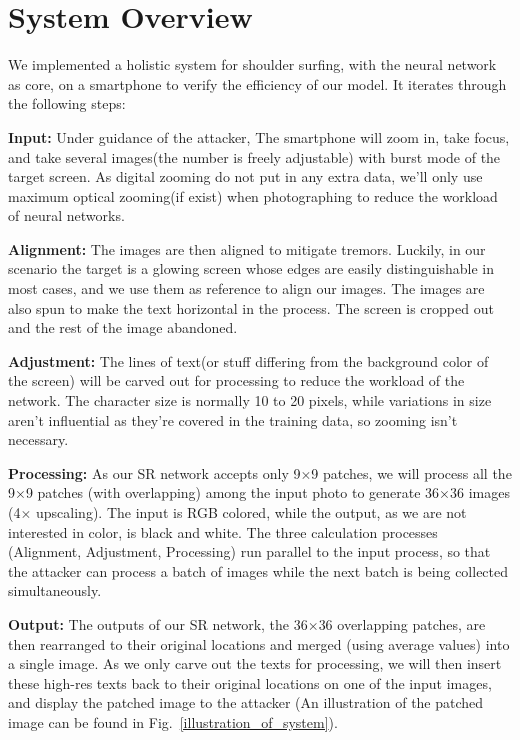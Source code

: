 \section{System Overview}
\label{sec-system-overview} 
We implemented a holistic system for shoulder surfing, with the neural network as core, on a smartphone to verify the efficiency of our model. It iterates through the following steps: 

\vspace{1mm}
\noindent
\textbf{Input:} Under guidance of the attacker, The smartphone will zoom in, take focus, and take several images(the number is freely adjustable) with burst mode of the target screen. As digital zooming do not put in any extra data, we'll only use maximum optical zooming(if exist) when photographing to reduce the workload of neural networks.

\vspace{1mm}
\noindent
\textbf{Alignment:} The images are then aligned to mitigate tremors. Luckily, in our scenario the target is a glowing screen whose edges are easily distinguishable in most cases, and we use them as reference to align our images. The images are also spun to make the text horizontal in the process. The screen is cropped out and the rest of the image abandoned.


\vspace{1mm}
\noindent
\textbf{Adjustment:} The lines of text(or stuff differing from the background color of the screen) will be carved out for processing to reduce the workload of the network. The character size is normally 10 to 20 pixels, while variations in size aren't influential as they're covered in the training data, so zooming isn't necessary.

\vspace{1mm}
\noindent
\textbf{Processing:} As our SR network accepts only 9$\times$9 patches, we will process all the 9$\times$9 patches (with overlapping) among the input photo to generate 36$\times$36 images (4$\times$ upscaling). The input is RGB colored, while the output, as we are not interested in color, is black and white. The three calculation processes (Alignment, Adjustment, Processing) run parallel to the input process, so that the attacker can process a batch of images while the next batch is being collected simultaneously.
		
\vspace{1mm}
\noindent
\textbf{Output:} The outputs of our SR network, the 36$\times$36 overlapping patches, are then rearranged to their original locations and merged (using average values) into a single image. As we only carve out the texts for processing, we will then insert these high-res texts back to their original locations on one of the input images, and display the patched image to the attacker (An illustration of the patched image can be found in Fig.~\ref{illustration_of_system}).


